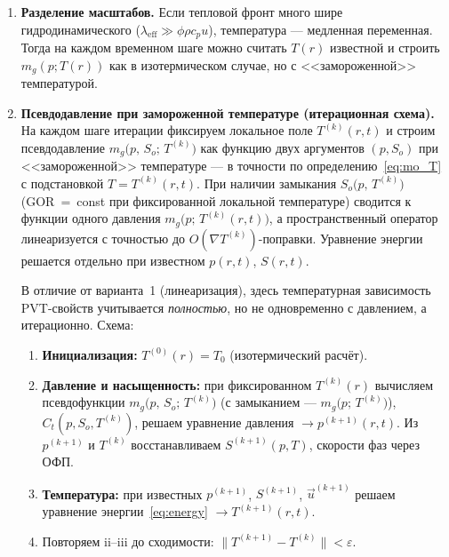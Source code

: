 ﻿\documentclass[12pt,a4paper]{article}
\begin{document}
\begin{enumerate}[nosep]
  \item \textbf{Разделение масштабов.}
        Если тепловой фронт много шире гидродинамического
        ($\lambda_{\mathrm{eff}} \gg \phi\rho c_p u$),
        температура --- медленная переменная. Тогда на каждом
        временном шаге можно считать $T(r)$ известной и строить
        $m_g(p; T(r))$ как в изотермическом случае, но
        с <<замороженной>> температурой.

  \item \textbf{Псевдодавление при замороженной температуре
        (итерационная схема).}
        На каждом шаге итерации фиксируем локальное поле
        $T^{(k)}(r,t)$ и строим псевдодавление
        $m_g\bigl(p,\,S_o;\, T^{(k)}\bigr)$ как функцию двух
        аргументов $(p, S_o)$ при <<замороженной>> температуре ---
        в точности по определению~\eqref{eq:mo_T} с подстановкой
        $T = T^{(k)}(r,t)$. При наличии замыкания
        $S_o\bigl(p,\,T^{(k)}\bigr)$ (GOR~=~const при фиксированной
        локальной температуре) сводится к функции одного давления
        $m_g\bigl(p;\, T^{(k)}(r,t)\bigr)$, а пространственный
        оператор линеаризуется с точностью до
        $O(\nabla T^{(k)})$-поправки. Уравнение энергии
        решается отдельно при известном $p(r,t)$, $S(r,t)$.

        В отличие от варианта~1 (линеаризация), здесь температурная
        зависимость PVT-свойств учитывается \emph{полностью},
        но не одновременно с давлением, а итерационно.
        Схема:
        \begin{enumerate}[label=\roman*., nosep]
          \item \textbf{Инициализация:} $T^{(0)}(r) = T_0$
                (изотермический расчёт).
          \item \textbf{Давление и насыщенность:}
                при фиксированном $T^{(k)}(r)$ вычисляем
                псевдофункции $m_g\bigl(p,\,S_o;\, T^{(k)}\bigr)$
                (с замыканием --- $m_g\bigl(p;\, T^{(k)}\bigr)$),
                $C_t(p,S_o,T^{(k)})$, решаем уравнение давления
                $\to p^{(k+1)}(r,t)$. Из $p^{(k+1)}$ и $T^{(k)}$
                восстанавливаем $S^{(k+1)}(p,T)$, скорости фаз
                через ОФП.
          \item \textbf{Температура:}
                при известных $p^{(k+1)}$, $S^{(k+1)}$,
                $\vec{u}^{(k+1)}$ решаем уравнение
                энергии~\eqref{eq:energy} $\to T^{(k+1)}(r,t)$.
          \item Повторяем ii--iii до сходимости:
                $\|T^{(k+1)} - T^{(k)}\| < \varepsilon$.
        \end{enumerate}


\end{enumerate}
\end{document}
